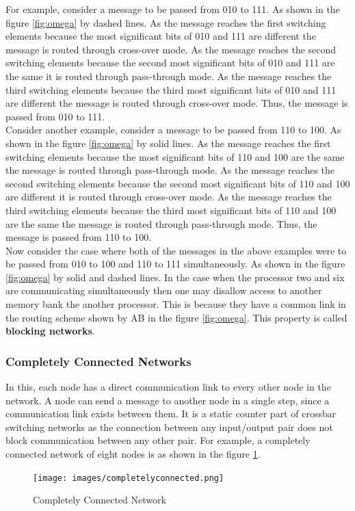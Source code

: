 \documentclass[12pt]{article}
\begin{document}
For example, consider a message to be passed from 010 to 111.
As shown in the figure \ref{fig:omega} by dashed lines. As the message reaches the first switching elements because the most significant bits of 010 and 111 are different
the message is routed through cross-over mode. As the message reaches the second switching elements because the second most significant bits of 010 and 111 are the same it 
is routed through pass-through mode. As the message reaches the third switching elements because the third most significant bits of 010 and 111 are different 
the message is routed through cross-over mode. Thus, the message is passed from 010 to 111. \\
Consider another example, consider a message to be passed from 110 to 100. 
As shown in the figure \ref{fig:omega} by solid lines. As the message reaches the first switching elements because the most significant bits of 110 and 100 are the same
the message is routed through pass-through mode. As the message reaches the second switching elements because the second most significant bits of 110 and 100 are different it
is routed through cross-over mode. As the message reaches the third switching elements because the third most significant bits of 110 and 100 are the same
the message is routed through pass-through mode. Thus, the message is passed from 110 to 100.\\
Now consider the case where both of the messages in the above examples were to be passed from 010 to 100 and 110 to 111 simultaneously.
As shown in the figure \ref{fig:omega} by solid and dashed lines. In the case when the processor two and six are communicating simultaneously
then one may disallow access to another memory bank the another processor. This is because they have a common link in the routing scheme shown by AB in the figure \ref{fig:omega}.
This property is called \textbf{blocking networks}.

\subsubsection{Completely Connected Networks}
In this, each node has a direct communication link to every other node in the network. A node can send a message to another node
in a single step, since a communication link exists between them. 
It is a static counter part of crossbar switching networks as the connection between any input/output pair does not block communication between any other pair.
For example, a completely connected network of eight nodes is as shown in the figure \ref{fig:complete}.
\begin{figure}[H]
    \centering
    \texttt{[image: images/completelyconnected.png]}
    \caption{Completely Connected Network}
    \label{fig:complete}
\end{figure}
\end{document}
